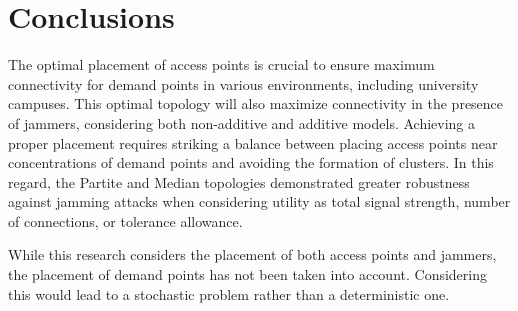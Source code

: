 \documentclass[runningheads]{llncs}
\begin{document}
	
	\section{Conclusions}
	
	The optimal placement of access points is crucial to ensure maximum connectivity for demand points in various environments, including university campuses. This optimal topology will also maximize connectivity in the presence of jammers, considering both non-additive and additive models.
	Achieving a proper placement requires striking a balance between placing access points near concentrations of demand points and avoiding the formation of clusters.	In this regard, the Partite and Median topologies demonstrated greater robustness against jamming attacks when considering utility as total signal strength, number of connections, or tolerance allowance.
	
	While this research considers the placement of both access points and jammers, the placement of demand points has not been taken into account. Considering this would lead to a stochastic problem rather than a deterministic one.
	
\end{document}
